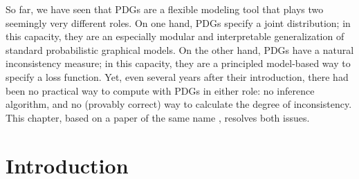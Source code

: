 \label{chap:infer}

So far, we have seen that PDGs are a flexible modeling tool that
    plays two seemingly very different roles.
On one hand, PDGs specify a joint distribution; in this capacity, they are an especially modular and interpretable generalization of standard probabilistic graphical models.
On the other hand, PDGs have a natural inconsistency measure; in this capacity, they are a principled model-based way to specify a loss function.
Yet, even several years after their introduction, there had been no practical way to compute with PDGs in either role: no inference algorithm, and no (provably correct) way to calculate the degree of inconsistency.
This chapter, based on a paper of the same name \cite{pdg-infer}, resolves both issues.

\newcommand\zogamma{{\mathrlap{\raisebox{-0.1ex}{$\hat{\phantom{x}}$}}\gamma}}
\newif\ifvfull
    \vfulltrue %

\section{Introduction}


